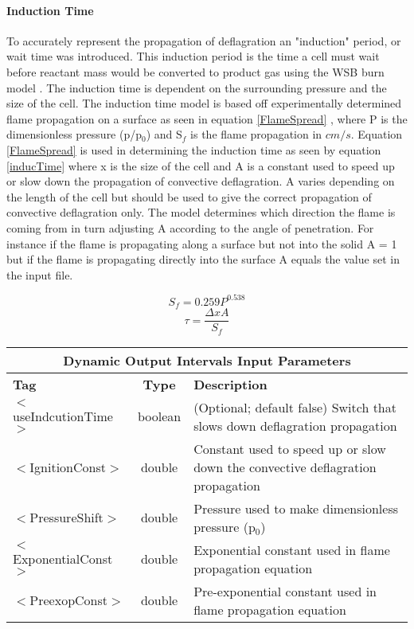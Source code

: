 \newpage
\paragraph{Induction Time} \label {Sec:Induction Time }
To accurately represent the propagation of deflagration an "induction" period, or wait time was introduced. This induction period is the time a cell must wait before reactant mass would be converted to product gas using the WSB burn model \cite{ref:wardsonbrewster}.   The induction time is dependent on the surrounding pressure and the size of the cell. The induction time model is based off experimentally determined flame propagation on a surface as seen in equation \ref{FlameSpread} \cite{flameProp}, where P is the dimensionless pressure (p/p$_0$) and S$_f$ is the flame propagation in $cm/s$. Equation \ref{FlameSpread} is used in determining the induction time as seen by equation \ref{inducTime} where x is the size of the cell and A is a constant used to speed up or slow down the propagation of convective deflagration. A varies depending on the length of the cell but should be used to give the correct propagation of convective deflagration only. The model determines which direction the flame is coming from in turn adjusting A according to the angle of penetration.
For instance if the flame is propagating along a surface but not into the solid A = 1 but if the flame is propagating directly into the surface A equals the value set in the input file.

\begin{equation}
S_f = 0.259{\displaystyle P^{0.538}}
\label{FlameSpread}
\end{equation}
\begin{equation}
\tau = \frac{\Delta x A}{S_f} 
\label{inducTime}
\end{equation}

\begin{center}
\begin{tabular}{| l | c | p{7cm} |}
\hline
  \multicolumn{3}{|c|}{\textbf{Dynamic Output Intervals Input Parameters}} \\
\hline
\hline
  \textbf{Tag} & \textbf{Type} & \textbf{Description}\\
\hline
  $<$useIndcutionTime$>$ & boolean & (Optional; default false) Switch that slows down deflagration propagation\\
\hline
  $<$IgnitionConst$>$ & double & Constant used to speed up or slow down the convective deflagration propagation\\
\hline
  $<$PressureShift$>$ & double & Pressure used to make dimensionless pressure (p$_0$)\\
\hline
  $<$ExponentialConst$>$ & double & Exponential constant used in flame propagation equation\\
\hline
  $<$PreexopConst$>$ & double & Pre-exponential constant used in flame propagation equation\\
\hline
\end{tabular}
\end{center}



